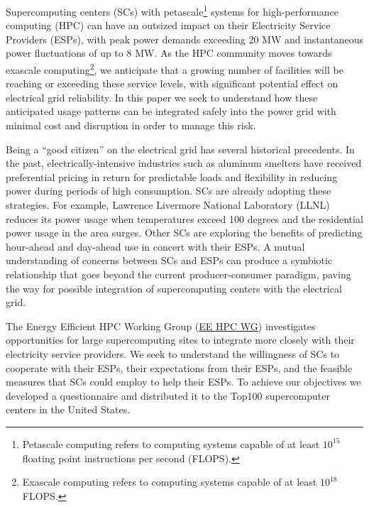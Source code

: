 Supercomputing centers (SCs) with petascale\footnote{Petascale computing refers to computing systems capable of at
least \(10^{15}\) floating point instructions per second (FLOPS).} 
systems for high-performance computing (HPC) can have an outsized 
impact on their Electricity Service Providers (ESPs), with peak 
power demands %
exceeding 20 MW and instantaneous power fluctuations of up to 8 MW. 
As the HPC community moves towards exascale computing\footnote{Exascale computing refers to computing systems capable of at
least \(10^{18}\)FLOPS.}, we anticipate that a growing number of facilities will
be reaching or exceeding these service levels, with significant potential 
effect on electrical grid reliability.
In this paper we seek to understand how these anticipated
usage patterns can be integrated safely into the power grid with minimal cost 
and disruption in order to manage
this risk.

Being a ``good citizen'' on the electrical grid has several historical precedents.
In the past, electrically-intensive industries such as aluminum smelters 
have received preferential pricing in return for predictable loads and
flexibility in reducing power during periods of high consumption.
SCs are already adopting these strategies.  
For example, Lawrence Livermore National Laboratory (LLNL)
reduces its power usage when temperatures exceed 
100 degrees and the residential power usage in the area surges.
Other %
SCs are exploring the benefits of predicting hour-ahead and 
day-ahead use in concert with their %
ESPs.
A mutual understanding of concerns between SCs and ESPs can 
produce a symbiotic relationship that goes beyond the current producer-consumer 
paradigm, paving the way for possible integration of %
supercomputing centers with the electrical grid.

The Energy Efficient HPC Working Group (\href {http://eehpcwg.lbl.gov/}{EE HPC WG})  
investigates opportunities for large supercomputing sites to  
integrate more closely with their electricity service providers.
We seek to understand the willingness of SCs to
cooperate with their ESPs, their expectations from their ESPs, and the feasible measures
that SCs could employ to help their ESPs.
To achieve our objectives we developed a questionnaire and distributed it to 
the Top100 supercomputer centers in the United States. 

